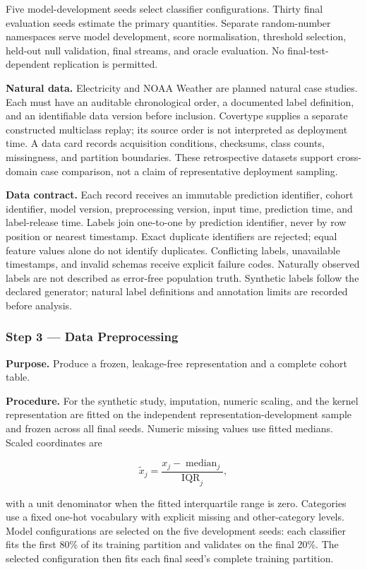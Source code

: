 \documentclass[
]{article}
\begin{document}
Five model-development seeds select classifier configurations. Thirty
final evaluation seeds estimate the primary quantities. Separate
random-number namespaces serve model development, score normalisation,
threshold selection, held-out null validation, final streams, and oracle
evaluation. No final-test-dependent replication is permitted.

\textbf{Natural data.} Electricity and NOAA Weather are planned natural
case studies. Each must have an auditable chronological order, a
documented label definition, and an identifiable data version before
inclusion. Covertype supplies a separate constructed multiclass replay;
its source order is not interpreted as deployment time. A data card
records acquisition conditions, checksums, class counts, missingness,
and partition boundaries. These retrospective datasets support
cross-domain case comparison, not a claim of representative deployment
sampling.

\textbf{Data contract.} Each record receives an immutable prediction
identifier, cohort identifier, model version, preprocessing version,
input time, prediction time, and label-release time. Labels join
one-to-one by prediction identifier, never by row position or nearest
timestamp. Exact duplicate identifiers are rejected; equal feature
values alone do not identify duplicates. Conflicting labels, unavailable
timestamps, and invalid schemas receive explicit failure codes.
Naturally observed labels are not described as error-free population
truth. Synthetic labels follow the declared generator; natural label
definitions and annotation limits are recorded before analysis.

\hypertarget{step-3-data-preprocessing}{%
\subsubsection{Step 3 --- Data
Preprocessing}\label{step-3-data-preprocessing}}

\textbf{Purpose.} Produce a frozen, leakage-free representation and a
complete cohort table.

\textbf{Procedure.} For the synthetic study, imputation, numeric
scaling, and the kernel representation are fitted on the independent
representation-development sample and frozen across all final seeds.
Numeric missing values use fitted medians. Scaled coordinates are

\[
\tilde{x}_j=\frac{x_j-\operatorname{median}_j}{\operatorname{IQR}_j},
\]

with a unit denominator when the fitted interquartile range is zero.
Categories use a fixed one-hot vocabulary with explicit missing and
other-category levels. Model configurations are selected on the five
development seeds: each classifier fits the first 80\% of its training
partition and validates on the final 20\%. The selected configuration
then fits each final seed's complete training partition.
\end{document}
